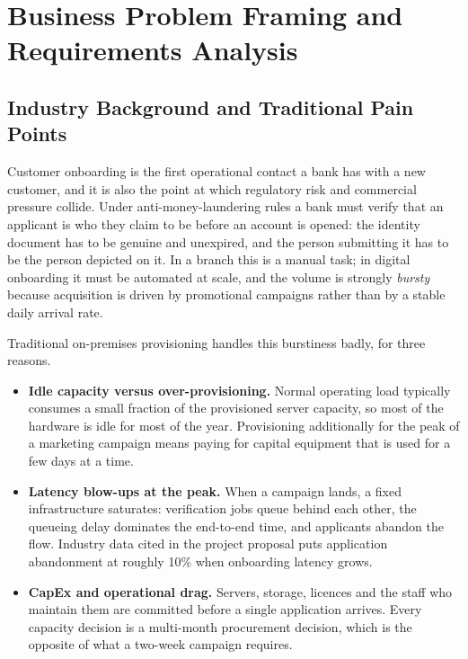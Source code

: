 \section{Business Problem Framing and Requirements Analysis}\label{sec:business}

\subsection{Industry Background and Traditional Pain Points}\label{sec:business:background}

Customer onboarding is the first operational contact a bank has with a new
customer, and it is also the point at which regulatory risk and commercial
pressure collide. Under anti-money-laundering rules a bank must verify that an
applicant is who they claim to be before an account is opened: the identity
document has to be genuine and unexpired, and the person submitting it has to be
the person depicted on it. In a branch this is a manual task; in digital
onboarding it must be automated at scale, and the volume is strongly \emph{bursty}
because acquisition is driven by promotional campaigns rather than by a stable
daily arrival rate.

Traditional on-premises provisioning handles this burstiness badly, for three
reasons.

\begin{itemize}
  \item \textbf{Idle capacity versus over-provisioning.} Normal operating load
        typically consumes a small fraction of the provisioned server capacity,
        so most of the hardware is idle for most of the year. Provisioning
        additionally for the peak of a marketing campaign means paying for
        capital equipment that is used for a few days at a time.
  \item \textbf{Latency blow-ups at the peak.} When a campaign lands, a fixed
        infrastructure saturates: verification jobs queue behind each other, the
        queueing delay dominates the end-to-end time, and applicants abandon the
        flow. Industry data cited in the project proposal puts application
        abandonment at roughly 10\% when onboarding latency grows.
  \item \textbf{CapEx and operational drag.} Servers, storage, licences and the
        staff who maintain them are committed before a single application
        arrives. Every capacity decision is a multi-month procurement decision,
        which is the opposite of what a two-week campaign requires.
\end{itemize}


